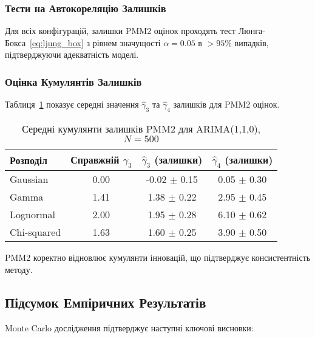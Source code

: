 \documentclass[12pt,a4paper]{article}
\begin{document}
\subsubsection{Тести на Автокореляцію Залишків}

Для всіх конфігурацій, залишки PMM2 оцінок проходять тест Люнга-Бокса~\eqref{eq:ljung_box} з рівнем значущості $\alpha = 0.05$ в $> 95\%$ випадків, підтверджуючи адекватність моделі.

\subsubsection{Оцінка Кумулянтів Залишків}

Таблиця~\ref{tab:residual_cumulants} показує середні значення $\hat{\gamma}_3$ та $\hat{\gamma}_4$ залишків для PMM2 оцінок.

\begin{table}[h]
\centering
\caption{Середні кумулянти залишків PMM2 для ARIMA(1,1,0), $N=500$}
\label{tab:residual_cumulants}
\begin{tabular}{@{}lccc@{}}
\toprule
\textbf{Розподіл} & \textbf{Справжній $\gamma_3$} & \textbf{$\hat{\gamma}_3$ (залишки)} & \textbf{$\hat{\gamma}_4$ (залишки)} \\
\midrule
Gaussian    & 0.00 & -0.02 $\pm$ 0.15 & 0.05 $\pm$ 0.30 \\
Gamma       & 1.41 & 1.38 $\pm$ 0.22 & 2.95 $\pm$ 0.45 \\
Lognormal   & 2.00 & 1.95 $\pm$ 0.28 & 6.10 $\pm$ 0.62 \\
Chi-squared & 1.63 & 1.60 $\pm$ 0.25 & 3.90 $\pm$ 0.50 \\
\bottomrule
\end{tabular}
\end{table}

PMM2 коректно відновлює кумулянти інновацій, що підтверджує консистентність методу.

\subsection{Підсумок Емпіричних Результатів}
\label{subsec:empirical_summary}

Monte Carlo дослідження підтверджує наступні ключові висновки:
\end{document}
